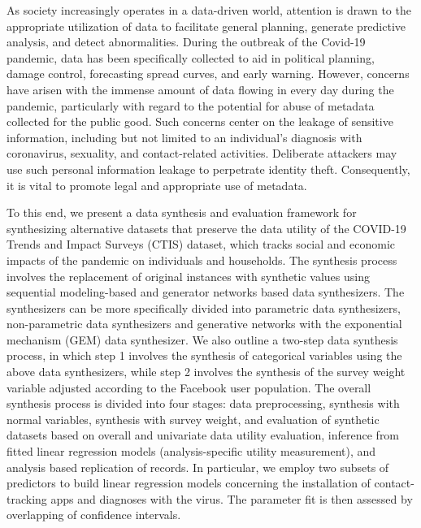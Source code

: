 As society increasingly operates in a data-driven world, attention is drawn to the appropriate utilization of data to facilitate general planning, generate predictive analysis, and detect abnormalities. During the outbreak of the Covid-19 pandemic, data has been specifically collected to aid in political planning, damage control, forecasting spread curves, and early warning. However, concerns have arisen with the immense amount of data flowing in every day during the pandemic, particularly with regard to the potential for abuse of metadata collected for the public good. Such concerns center on the leakage of sensitive information, including but not limited to an individual's diagnosis with coronavirus, sexuality, and contact-related activities. Deliberate attackers may use such personal information leakage to perpetrate identity theft. Consequently, it is vital to promote legal and appropriate use of metadata.

To this end, we present a data synthesis and evaluation framework for synthesizing alternative datasets that preserve the data utility of the COVID-19 Trends and Impact Surveys (CTIS) dataset, which tracks social and economic impacts of the pandemic on individuals and households. The synthesis process involves the replacement of original instances with synthetic values using sequential modeling-based and generator networks based data synthesizers. The synthesizers can be more specifically divided into parametric data synthesizers, non-parametric data synthesizers and generative networks with the exponential mechanism (GEM) data synthesizer. We also outline a two-step data synthesis process, in which step 1 involves the synthesis of categorical variables using the above data synthesizers, while step 2 involves the synthesis of the survey weight variable adjusted according to the Facebook user population. The overall synthesis process is divided into four stages: data preprocessing, synthesis with normal variables, synthesis with survey weight, and evaluation of synthetic datasets based on overall and univariate data utility evaluation, inference from fitted linear regression models (analysis-specific utility measurement), and analysis based replication of records. In particular, we employ two subsets of predictors to build linear regression models concerning the installation of contact-tracking apps and diagnoses with the virus. The parameter fit is then assessed by overlapping of confidence intervals.

